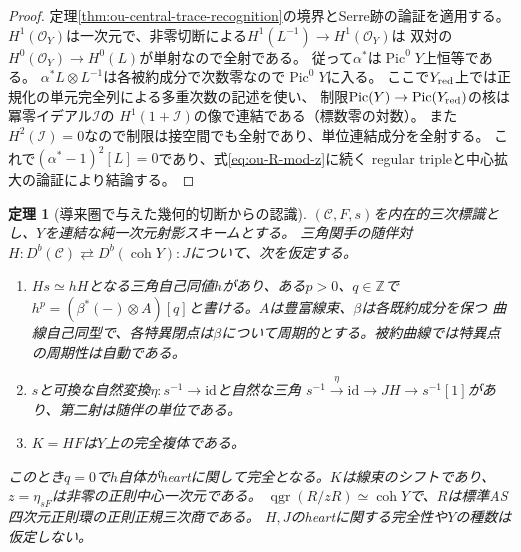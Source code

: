 \documentclass[11pt,a4paper]{ltjsarticle}
\newtheorem{theorem}{定理}[section]
\theoremstyle{definition}
\newcommand{\qgr}{\operatorname{qgr}}
\newcommand{\coh}{\operatorname{coh}}
\newcommand{\Pic}{\operatorname{Pic}}
\begin{document}
\begin{proof}
定理\ref{thm:ou-central-trace-recognition}の境界とSerre跡の論証を適用する。
$H^1(\mathcal O_Y)$は一次元で、非零切断による$H^1(L^{-1})\to H^1(\mathcal O_Y)$は
双対の$H^0(\mathcal O_Y)\to H^0(L)$が単射なので全射である。
従って$\alpha^*$は$\Pic^0Y$上恒等である。
$\alpha^*L\otimes L^{-1}$は各被約成分で次数零なので$\Pic^0Y$に入る。
ここで$Y_{\rm red}$上では正規化の単元完全列による多重次数の記述を使い、
制限$\Pic(Y)\to\Pic(Y_{\rm red})$の核は冪零イデアル$\mathcal I$の
$H^1(1+\mathcal I)$の像で連結である（標数零の対数）。
また$H^2(\mathcal I)=0$なので制限は接空間でも全射であり、単位連結成分を全射する。
これで$(\alpha^*-1)^2[L]=0$であり、式\eqref{eq:ou-R-mod-z}に続く
regular tripleと中心拡大の論証により結論する。
\end{proof}


\begin{theorem}[導来圏で与えた幾何的切断からの認識]
\label{thm:ou-derived-geometric-divisor}
$(\mathcal C,F,s)$を内在的三次標識とし、$Y$を連結な純一次元射影スキームとする。
三角関手の随伴対
$H:D^b(\mathcal C)\rightleftarrows D^b(\coh Y):J$について、次を仮定する。
\begin{enumerate}[label=(\roman*)]
\item $Hs\simeq hH$となる三角自己同値$h$があり、ある$p>0$、$q\in\mathbb Z$で
$h^p=(\beta^*(-)\otimes A)[q]$と書ける。$A$は豊富線束、$\beta$は各既約成分を保つ
曲線自己同型で、各特異閉点は$\beta$について周期的とする。被約曲線では特異点の周期性は自動である。
\item $s$と可換な自然変換$\eta:s^{-1}\to\mathrm{id}$と自然な三角
$s^{-1}\xrightarrow{\eta}\mathrm{id}\to JH\to s^{-1}[1]$があり、第二射は随伴の単位である。
\item $K=HF$は$Y$上の完全複体である。
\end{enumerate}
このとき$q=0$で$h$自体がheartに関して完全となる。$K$は線束のシフトであり、$z=\eta_{sF}$は非零の正則中心一次元である。
$\qgr(R/zR)\simeq\coh Y$で、$R$は標準AS四次元正則環の正則正規三次商である。
$H,J$のheartに関する完全性や$Y$の種数は仮定しない。
\end{theorem}
\end{document}
